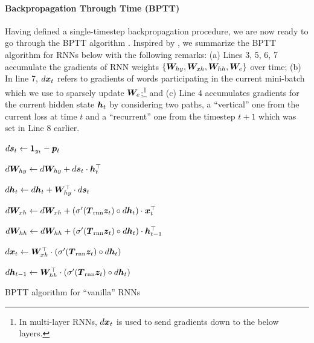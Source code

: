 \paragraph{Backpropagation Through Time (BPTT)}
\begin{sloppypar}
Having defined a single-timestep backpropagation procedure, we are now ready to
go through the BPTT algorithm \cite{Rumelhart:1986:LPT,werbos1990}. 
Inspired by 
, we summarize the BPTT algorithm for RNNs below with the
following remarks: (a) Lines 3, 5, 6, 7 accumulate the gradients of RNN weights
$\{\bm{W}_{hy}, \bm{W}_{xh}, \bm{W}_{hh}, \bm{W}_{e}\}$ over time; (b) In line 7, $d\bm{x}_{t}$ refers to
gradients of words participating in the current mini-batch which we use to
sparsely update $\bm{W}_{e}$;\footnote{In multi-layer
RNNs, $d\bm{x}_{t}$ is used to send gradients down to the below layers.} and (c) Line
4 accumulates gradients for the current hidden state $\bm{h}_{t}$ by considering two paths,
a ``vertical'' one from  the current loss at time $t$ and a ``recurrent'' one from the timestep
$t+1$ which was set in Line 8 earlier.
\end{sloppypar}

\begin{algorithm}
{
$d\bm{s}_{t} \leftarrow \bm{1}_{y_t} - \bm{p}_{t}$

$d\bm{W}_{hy} \leftarrow d\bm{W}_{hy} + d\bm{s}_{t} \cdot \bm{h}_{t}^\top$

$d\bm{h}_{t} \leftarrow d\bm{h}_{t} + \bm{W}_{hy}^\top \cdot d\bm{s}_{t}$

$d\bm{W}_{xh} \leftarrow d\bm{W}_{xh} + \left(\sigma'(\mbox{\boldmath{$T$}}_{\text{rnn}} \bm{z}_{t}) \circ d\bm{h}_{t}\right) \cdot \bm{x}_{t}^\top$

$d\bm{W}_{hh} \leftarrow d\bm{W}_{hh} + \left(\sigma'(\mbox{\boldmath{$T$}}_{\text{rnn}} \bm{z}_{t}) \circ d\bm{h}_{t}\right) \cdot \bm{h}_{t-1}^\top$

$d\bm{x}_{t} \leftarrow \bm{W}_{xh}^\top \cdot \left(\sigma'(\mbox{\boldmath{$T$}}_{\text{rnn}} \bm{z}_{t}) \circ d\bm{h}_{t}\right)$

$d\bm{h}_{t-1} \leftarrow \bm{W}_{hh}^\top \cdot \left(\sigma'(\mbox{\boldmath{$T$}}_{\text{rnn}} \bm{z}_{t}) \circ d\bm{h}_{t}\right)$
}
\caption{BPTT algorithm for ``vanilla'' RNNs}
\end{algorithm}

